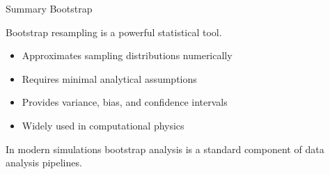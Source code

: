 \documentclass{beamer}
\begin{document}

\begin{frame}{Summary Bootstrap}

Bootstrap resampling is a powerful statistical tool.

\begin{itemize}

\item Approximates sampling distributions numerically
\item Requires minimal analytical assumptions
\item Provides variance, bias, and confidence intervals
\item Widely used in computational physics

\end{itemize}

In modern simulations bootstrap analysis is a standard component of data analysis pipelines.
\end{frame}
\end{document}
